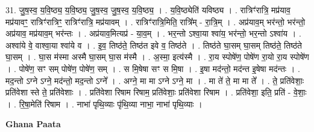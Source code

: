 \documentclass[17pt]{extarticle}
\begin{document}
31. जु॒ष॒स्व॒ य॒वि॒ष्ठ्य॒ य॒वि॒ष्ठ्य॒ जु॒ष॒स्व॒ जु॒ष॒स्व॒ य॒वि॒ष्ठ्य॒ । . य॒वि॒ष्ठ्येति॑ यविष्ठ्य । . रात्रिꣳ॑रात्रि॒ मप्र॑याव॒ मप्र॑यावꣳ॒॒ रात्रिꣳ॑रात्रिꣳ॒॒ रात्रिꣳ॑रात्रि॒ मप्र॑यावम् । . रात्रिꣳ॑रात्रि॒मिति॒ रात्रि᳚म् - रा॒त्रि॒म् । . अप्र॑याव॒म् भर॑न्तो॒ भर॑न्तो॒ अप्र॑याव॒ मप्र॑याव॒म् भर॑न्तः । . अप्र॑याव॒मित्यप्र॑ - या॒व॒म् । . भर॒न्तो ऽश्वा॒या श्वा॑य॒ भर॑न्तो॒ भर॒न्तो ऽश्वा॑य । . अश्वा॑ये वे॒ वाश्वा॒या श्वा॑ये व । . इ॒व॒ तिष्ठ॑ते॒ तिष्ठ॑त इवे व॒ तिष्ठ॑ते । . तिष्ठ॑ते घा॒सम् घा॒सम् तिष्ठ॑ते॒ तिष्ठ॑ते घा॒सम् । . घा॒स म॑स्मा अस्मै घा॒सम् घा॒स म॑स्मै । . अ॒स्मा॒ इत्य॑स्मै । . रा॒य स्पोषे॑ण॒ पोषे॑ण रा॒यो रा॒य स्पोषे॑ण । . पोषे॑ण॒ सꣳ सम् पोषे॑ण॒ पोषे॑ण॒ सम् । . स मि॒षेषा सꣳ स मि॒षा । . इ॒षा मद॑न्तो॒ मद॑न्त इ॒षेषा मद॑न्तः । . मद॒न्तो ऽग्ने ऽग्ने॒ मद॑न्तो॒ मद॒न्तो ऽग्ने᳚ । . अग्ने॒ मा मा ऽग्ने ऽग्ने॒ मा । . मा ते॑ ते॒ मा मा ते᳚ । . ते॒ प्रति॑वेशाः॒ प्रति॑वेशा स्ते ते॒ प्रति॑वेशाः । . प्रति॑वेशा रिषाम रिषाम॒ प्रति॑वेशाः॒ प्रति॑वेशा रिषाम । . प्रति॑वेशा॒ इति॒ प्रति॑ - वे॒शाः॒ । . रि॒षा॒मेति॑ रिषाम । . नाभा॑ पृथि॒व्याः पृ॑थि॒व्या नाभा॒ नाभा॑ पृथि॒व्याः । \newline

\textbf{Ghana Paata } \newline
\end{document}

